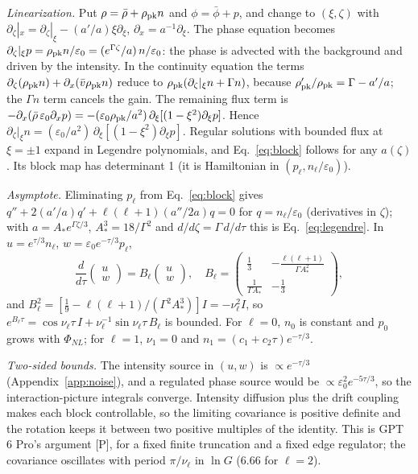 \documentclass[aps,pra,twocolumn,superscriptaddress,nofootinbib,floatfix]{revtex4-2}
\newcommand{\PNL}{\Phi_{NL}}
\newcommand{\eps}{\varepsilon_0}
\newcommand{\rk}[1]{[\textsf{#1}]}
\begin{document}
\textit{Linearization.} Put $\rho=\bar\rho+\rho_{\rm pk}n$ and $\phi=\bar\phi+p$, and change to $(\xi,\zeta)$ with
$\partial_\zeta|_x=\partial_\zeta|_\xi-(a'/a)\xi\partial_\xi$, $\partial_x=a^{-1}\partial_\xi$. The phase equation becomes
$\partial_\zeta|_\xi p=\rho_{\rm pk}n/\eps=(e^{\Gamma\zeta}/a)\,n/\eps$: the phase is advected with the background and
driven by the intensity. In the continuity equation the terms $\partial_\zeta(\rho_{\rm pk}n)+\partial_x(\bar v\rho_{\rm pk}n)$
reduce to $\rho_{\rm pk}(\partial_\zeta|_\xi n+\Gamma n)$, because $\rho_{\rm pk}'/\rho_{\rm pk}=\Gamma-a'/a$; the
$\Gamma n$ term cancels the gain. The remaining flux term is $-\partial_x(\bar\rho\,\eps\partial_xp)
=-(\eps\rho_{\rm pk}/a^2)\,\partial_\xi[(1-\xi^2)\partial_\xi p]$. Hence
$\partial_\zeta|_\xi n=(\eps/a^2)\,\partial_\xi[(1-\xi^2)\partial_\xi p]$. Regular solutions with bounded flux at
$\xi=\pm1$ expand in Legendre polynomials, and Eq.~\eqref{eq:block} follows for any $a(\zeta)$. Its block map has
determinant 1 (it is Hamiltonian in $(p_\ell,n_\ell/\eps)$).

\textit{Asymptote.} Eliminating $p_\ell$ from Eq.~\eqref{eq:block} gives $q''+2(a'/a)q'+\ell(\ell+1)(a''/2a)q=0$ for
$q=n_\ell/\eps$ (derivatives in $\zeta$); with $a=A_*e^{\Gamma\zeta/3}$, $A_*^3=18/\Gamma^2$ and $d/d\zeta=\Gamma\,d/d\tau$
this is Eq.~\eqref{eq:legendre}. In $u=e^{\tau/3}n_\ell$, $w=\eps e^{-\tau/3}p_\ell$,
\begin{equation}
\frac{d}{d\tau}\begin{pmatrix}u\\w\end{pmatrix}=B_\ell\begin{pmatrix}u\\w\end{pmatrix},\quad
B_\ell=\begin{pmatrix}\tfrac13&-\tfrac{\ell(\ell+1)}{\Gamma A_*^2}\\ \tfrac{1}{\Gamma A_*}&-\tfrac13\end{pmatrix},
\end{equation}
and $B_\ell^2=[\frac19-\ell(\ell+1)/(\Gamma^2A_*^3)]I=-\nu_\ell^2I$, so $e^{B_\ell\tau}=\cos\nu_\ell\tau\,I+\nu_\ell^{-1}\sin\nu_\ell\tau\,B_\ell$
is bounded. For $\ell=0$, $n_0$ is constant and $p_0$ grows with $\PNL$; for $\ell=1$, $\nu_1=0$ and $n_1=(c_1+c_2\tau)e^{-\tau/3}$.

\textit{Two-sided bounds.} The intensity source in $(u,w)$ is $\propto e^{-\tau/3}$ (Appendix~\ref{app:noise}), and a
regulated phase source would be $\propto\eps^2e^{-5\tau/3}$, so the interaction-picture integrals converge. Intensity
diffusion plus the drift coupling makes each block controllable, so the limiting covariance is positive definite and
the rotation keeps it between two positive multiples of the identity. This is GPT 6 Pro's argument \rk{P}, for a fixed
finite truncation and a fixed edge regulator; the covariance oscillates with period $\pi/\nu_\ell$ in $\ln G$ (6.66 for
$\ell=2$).
\end{document}
